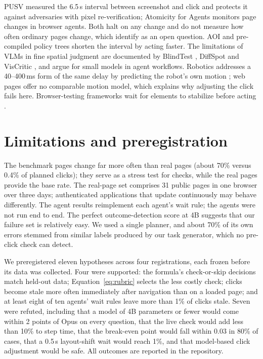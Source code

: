 \documentclass[10pt]{article}
\begin{document}
PUSV \citep{pusv} measured the 6.5\,s interval between screenshot and click and protects it against adversaries with pixel re-verification; Atomicity for Agents \citep{atomicity} monitors page changes in browser agents. Both halt on any change and do not measure how often ordinary pages change, which \citet{vcd} identify as an open question. AOI \citep{aoi} and pre-compiled policy trees \citep{aapt} shorten the interval by acting faster. The limitations of VLMs in fine spatial judgment are documented by BlindTest \citep{blindtest}, DiffSpot \citep{diffspot} and VisCritic \citep{viscritic}, and \citet{belcak} argue for small models in agent workflows. Robotics addresses a 40--400\,ms form of the same delay by predicting the robot's own motion \citep{rtc,vlash,a2c2,arli}; web pages offer no comparable motion model, which explains why adjusting the click fails here. Browser-testing frameworks wait for elements to stabilize before acting \citep{playwright}.

\section{Limitations and preregistration}

The benchmark pages change far more often than real pages (about 70\% versus 0.4\% of planned clicks); they serve as a stress test for checks, while the real pages provide the base rate. The real-page set comprises 31 public pages in one browser over three days; authenticated applications that update continuously may behave differently. The agent results reimplement each agent's wait rule; the agents were not run end to end. The perfect outcome-detection score at 4B suggests that our failure set is relatively easy. We used a single planner, and about 70\% of its own errors stemmed from similar labels produced by our task generator, which no pre-click check can detect.

We preregistered eleven hypotheses across four registrations, each frozen before its data was collected. Four were supported: the formula's check-or-skip decisions match held-out data; Equation~\ref{eq:rubric} selects the less costly check; clicks become stale more often immediately after navigation than on a loaded page; and at least eight of ten agents' wait rules leave more than 1\% of clicks stale. Seven were refuted, including that a model of 4B parameters or fewer would come within 2 points of Opus on every question, that the live check would add less than 10\% to step time, that the break-even point would fall within 0.03 in 80\% of cases, that a 0.5\,s layout-shift wait would reach 1\%, and that model-based click adjustment would be safe. All outcomes are reported in the repository.
\end{document}
